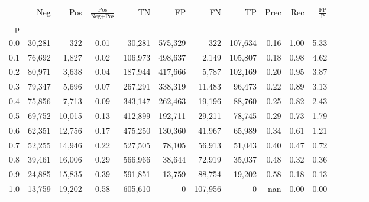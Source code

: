 \begin{tabular}{rrrcrrrrrrrrrrr}
\toprule
{} &     Neg &     Pos & $\frac{\text{Pos}}{\text{Neg}+\text{Pos}}$ &       TN &       FP &       FN &       TP &  Prec &   Rec & $\frac{\text{FP}}{\text{P}}$ \\
p   &         &         &                                            &          &          &          &          &       &       &                              \\
\midrule
0.0 &  30,281 &     322 &                                       0.01 &   30,281 &  575,329 &      322 &  107,634 &  0.16 &  1.00 &                         5.33 \\
0.1 &  76,692 &   1,827 &                                       0.02 &  106,973 &  498,637 &    2,149 &  105,807 &  0.18 &  0.98 &                         4.62 \\
0.2 &  80,971 &   3,638 &                                       0.04 &  187,944 &  417,666 &    5,787 &  102,169 &  0.20 &  0.95 &                         3.87 \\
0.3 &  79,347 &   5,696 &                                       0.07 &  267,291 &  338,319 &   11,483 &   96,473 &  0.22 &  0.89 &                         3.13 \\
0.4 &  75,856 &   7,713 &                                       0.09 &  343,147 &  262,463 &   19,196 &   88,760 &  0.25 &  0.82 &                         2.43 \\
0.5 &  69,752 &  10,015 &                                       0.13 &  412,899 &  192,711 &   29,211 &   78,745 &  0.29 &  0.73 &                         1.79 \\
0.6 &  62,351 &  12,756 &                                       0.17 &  475,250 &  130,360 &   41,967 &   65,989 &  0.34 &  0.61 &                         1.21 \\
0.7 &  52,255 &  14,946 &                                       0.22 &  527,505 &   78,105 &   56,913 &   51,043 &  0.40 &  0.47 &                         0.72 \\
0.8 &  39,461 &  16,006 &                                       0.29 &  566,966 &   38,644 &   72,919 &   35,037 &  0.48 &  0.32 &                         0.36 \\
0.9 &  24,885 &  15,835 &                                       0.39 &  591,851 &   13,759 &   88,754 &   19,202 &  0.58 &  0.18 &                         0.13 \\
1.0 &  13,759 &  19,202 &                                       0.58 &  605,610 &        0 &  107,956 &        0 &   nan &  0.00 &                         0.00 \\
\bottomrule
\end{tabular}
